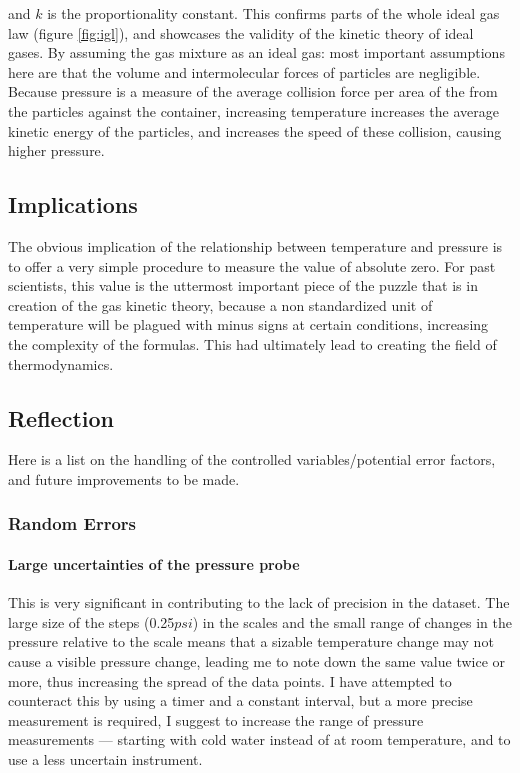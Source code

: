 \documentclass[a4paper,12pt]{article}
\begin{document}
and $k$ is the proportionality constant. This confirms parts of the whole ideal gas law (figure \ref{fig:igl}), and showcases the validity of the kinetic theory of ideal gases.
By assuming the gas mixture as an ideal gas: most important assumptions here are that the volume and intermolecular forces of particles are negligible. Because pressure is a measure of the average collision force per area of the from the particles against the container, increasing temperature increases the average kinetic energy of the particles, and increases the speed of these collision, causing higher pressure.

\subsection{Implications}
The obvious implication of the relationship between temperature and pressure is to offer a very simple procedure to measure the value of absolute zero. For past scientists, this value is the uttermost important piece of the puzzle that is in creation of the gas kinetic theory, because a non standardized unit of temperature will be plagued with minus signs at certain conditions, increasing the complexity of the formulas. This had ultimately lead to creating the field of thermodynamics.

\subsection{Reflection}

Here is a list on the handling of the controlled variables/potential error factors, and future improvements to be made.

\subsubsection{Random Errors}
\paragraph{Large uncertainties of the pressure probe} This is very significant in contributing to the lack of precision in the dataset. The large size of the steps (0.25$\si{psi}$) in the scales and the small range of changes in the pressure relative to the scale means that a sizable temperature change may not cause a visible pressure change, leading me to note down the same value twice or more, thus increasing the spread of the data points. I have attempted to counteract this by using a timer and a constant interval, but a more precise measurement is required, I suggest to increase the range of pressure measurements --- starting with cold water instead of at room temperature, and to use a less uncertain instrument.
\end{document}
